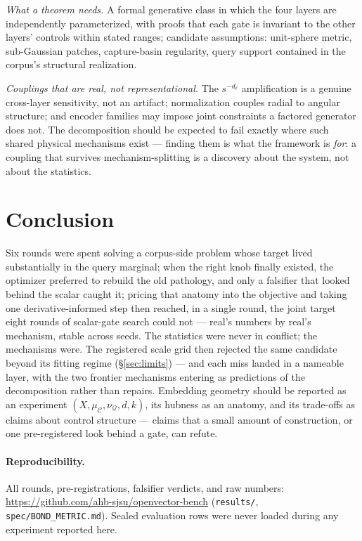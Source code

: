 \documentclass[11pt]{article}
\newcommand{\muC}{\mu_{\mathcal{C}}}
\newcommand{\nuQ}{\nu_{\mathcal{Q}}}
\begin{document}
\emph{What a theorem needs.} A formal generative class in which the four
layers are independently parameterized, with proofs that each gate is
invariant to the other layers' controls within stated ranges; candidate
assumptions: unit-sphere metric, sub-Gaussian patches, capture-basin
regularity, query support contained in the corpus's structural realization.

\emph{Couplings that are real, not representational.} The $s^{-d_\ell}$
amplification is a genuine cross-layer sensitivity, not an artifact;
normalization couples radial to angular structure; and encoder families may
impose joint constraints a factored generator does not. The decomposition
should be expected to fail exactly where such shared physical mechanisms
exist --- finding them is what the framework is \emph{for}: a coupling that
survives mechanism-splitting is a discovery about the system, not about the
statistics.

\section{Conclusion}\label{sec:conclusion}
Six rounds were spent solving a corpus-side problem whose target lived
substantially in the query marginal; when the right knob finally existed, the
optimizer preferred to rebuild the old pathology, and only a falsifier that
looked behind the scalar caught it; pricing that anatomy into the objective
and taking one derivative-informed step then reached, in a single round, the
joint target eight rounds of scalar-gate search could not --- real's numbers
by real's mechanism, stable across seeds. The statistics were never in
conflict; the mechanisms were. The registered scale grid then rejected the
same candidate beyond its fitting regime (\S\ref{sec:limits}) --- and each
miss landed in a nameable layer, with the two frontier mechanisms entering as
predictions of the decomposition rather than repairs. Embedding geometry
should be reported as an experiment $(X,\muC,\nuQ,d,k)$, its hubness as an
anatomy, and its trade-offs as claims about control structure --- claims that
a small amount of construction, or one pre-registered look behind a gate, can
refute.

\paragraph{Reproducibility.} All rounds, pre-registrations, falsifier verdicts,
and raw numbers: \url{https://github.com/ahb-sjsu/openvector-bench}
(\texttt{results/}, \texttt{spec/BOND\_METRIC.md}). Sealed evaluation rows were
never loaded during any experiment reported here.
\end{document}

